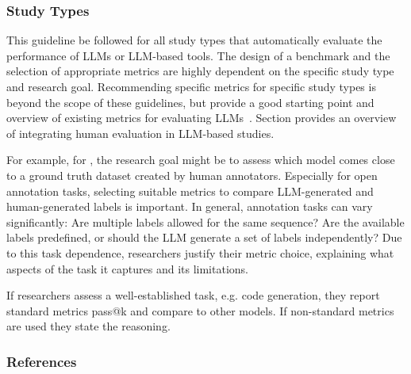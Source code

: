 \subsubsection{Study Types}

This guideline \must be followed for all study types that automatically evaluate the performance of LLMs or LLM-based tools.
The design of a benchmark and the selection of appropriate metrics are highly dependent on the specific study type and research goal.
Recommending specific metrics for specific study types is beyond the scope of these guidelines, but \citeauthor{10.1145/3695988} provide a good starting point and overview of existing metrics for evaluating LLMs~\cite{10.1145/3695988}.
Section \humanvalidation provides an overview of integrating human evaluation in LLM-based studies. 

For example, for \annotators, the research goal might be to assess which model comes close to a ground truth dataset created by human annotators.
Especially for open annotation tasks, selecting suitable metrics to compare LLM-generated and human-generated labels is important.
In general, annotation tasks can vary significantly: Are multiple labels allowed for the same sequence? Are the available labels predefined, or should the LLM generate a set of labels independently?
Due to this task dependence, researchers \must justify their metric choice, explaining what aspects of the task it captures and its limitations.

If researchers assess a well-established task, e.g. code generation, they \should report standard metrics pass@k and compare to other models.
If non-standard metrics are used they \must state the reasoning.

\subsubsection{References}







